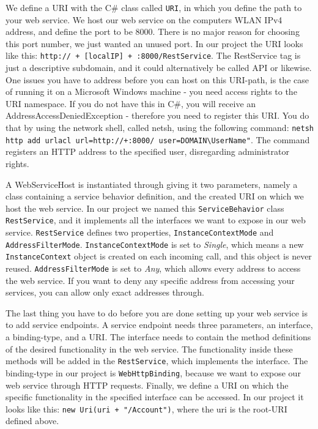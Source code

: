 We define a URI with the C\# class called \texttt{URI}\cite{URIclass}, in which you define the path to your web service. We host our web service on the computers WLAN IPv4 address, and define the port to be 8000. There is no major reason for choosing this port number, we just wanted an unused port. In our project the URI looks like this: \texttt{http:// + [localIP] + :8000/RestService}. The RestService tag is just a descriptive subdomain, and it could alternatively be called API or likewise. One issues you have to address before you can host on this URI-path, is the case of running it on a Microsoft Windows machine - you need access rights to the URI namespace. If you do not have this in C\#, you will receive an AddressAccessDeniedException - therefore you need to register this URI. You do that by using the network shell, called netsh, using the following command: \texttt{netsh http add urlacl url=http://+:8000/ user=DOMAIN\textbackslash UserName"}. The command registers an HTTP address to the specified user, disregarding administrator rights\cite{netshURI}.

A WebServiceHost is instantiated through giving it two parameters, namely a class containing a service behavior definition, and the created URI on which we host the web service. In our project we named this \texttt{ServiceBehavior}\cite{ServiceBehavior} class \texttt{RestService}, and it implements all the interfaces we want to expose in our web service. \texttt{RestService} defines two properties, \texttt{InstanceContextMode}\cite{InstanceCtxMode} and \texttt{AddressFilterMode}\cite{AddressFilterMode}. \texttt{InstanceContextMode} is set to \textit{Single}, which means a new \texttt{InstanceContext} object is created on each incoming call, and this object is never reused. \texttt{AddressFilterMode} is set to \textit{Any}, which allows every address to access the web service. If you want to deny any specific address from accessing your services, you can allow only exact addresses through. 

The last thing you have to do before you are done setting up your web service is to add service endpoints. A service endpoint needs three parameters, an interface, a binding-type, and a URI. The interface needs to contain the method definitions of the desired functionality in the web service. The functionality inside these methods will be added in the \texttt{RestService}, which implements the interface. The binding-type in our project is \texttt{WebHttpBinding}\cite{WebHttpBinding}, because we want to expose our web service through HTTP requests. Finally, we define a URI on which the specific functionality in the specified interface can be accessed. In our project it looks like this: \texttt{new Uri(uri + "/Account")}, where the uri is the root-URI defined above.

